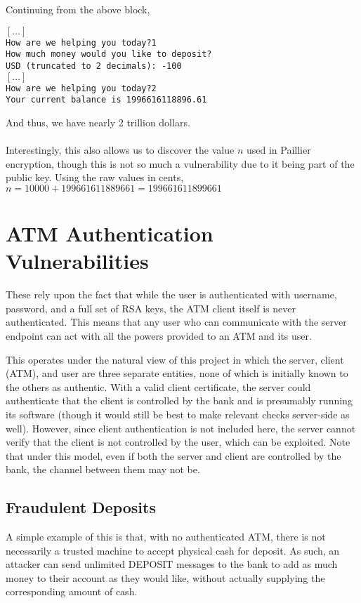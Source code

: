 \documentclass{article}
\newcommand{\codebox}[1]{\begin{tcolorbox}[
    colback=codebackground, boxsep=2pt,
    colframe=white, boxrule=0pt,
    top=0pt, bottom=0pt, left=0pt, right=0pt
]\texttt{#1}
\end{tcolorbox}}
\begin{document}
Continuing from the above block,
\codebox{$[\ldots]$ \\
    How are we helping you today?1 \\
    How much money would you like to deposit? \\
    USD (truncated to 2 decimals): -100 \\
    $[\ldots]$ \\
    How are we helping you today?2 \\
    Your current balance is 1996616118896.61
}
And thus, we have nearly 2 trillion dollars. \\
\\
Interestingly, this also allows us to discover the value $n$ used in Paillier encryption,
though this is not so much a vulnerability due to it being part of the public key.
Using the raw values in cents, $n = 10000 + 199661611889661 = 199661611899661$

\section{ATM Authentication Vulnerabilities}
These rely upon the fact that while the user is authenticated with username, password, and a full set of RSA keys,
the ATM client itself is never authenticated.
This means that any user who can communicate with the server endpoint can act with all the powers provided to an ATM and its user.

This operates under the natural view of this project in which the server, client (ATM),
and user are three separate entities, none of which is initially known to the others as authentic.
With a valid client certificate, the server could authenticate that the client is controlled by the bank and is
presumably running its software (though it would still be best to make relevant checks server-side as well).
However, since client authentication is not included here, the server cannot verify that the client is not
controlled by the user, which can be exploited. Note that under this model, even if both the server and
client are controlled by the bank, the channel between them may not be.

\subsection{Fraudulent Deposits}
A simple example of this is that, with no authenticated ATM, there is not necessarily a trusted machine
to accept physical cash for deposit. As such, an attacker can send unlimited DEPOSIT messages to the bank to
add as much money to their account as they would like, without actually supplying the corresponding amount of cash.
\end{document}
